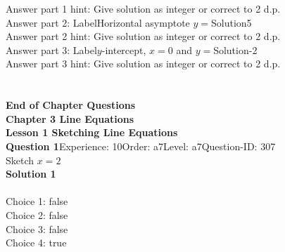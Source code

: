 \documentclass{article}
\begin{document}
Answer part 1 hint: \hspace{15pt}Give solution as integer or correct to 2 d.p.\\
Answer part 2: \hspace{10pt}Label\hspace{10pt}Horizontal asymptote $y =$\hspace{10pt}Solution\hspace{10pt}5\\
Answer part 2 hint: \hspace{15pt}Give solution as integer or correct to 2 d.p.\\
Answer part 3: \hspace{10pt}Label\hspace{10pt}$y$-intercept, $x=0$ and $y=$\hspace{10pt}Solution\hspace{10pt}-2\\
Answer part 3 hint: \hspace{15pt}Give solution as integer or correct to 2 d.p.\\
\\[4pt]
\\[2pt]
\noindent\large{\textbf{End of Chapter Questions}}\\[15pt]
\noindent\huge{\textbf{Chapter 3 Line Equations}}\\[15pt]
\noindent\huge{\textbf{Lesson 1 Sketching Line Equations}}\\[12pt]
\noindent\textbf{Question 1}\hspace{20pt}Experience: 10\hspace{20pt}Order: a7\hspace{20pt}Level: a7\hspace{20pt}Question-ID: 307\\[2pt]
Sketch $x=2$\\[4pt]
\noindent\textbf{Solution 1}\\[2pt]
\\[4pt]
Choice 1: \hspace{20pt} \hspace{20pt}false\\
Choice 2: \hspace{20pt} \hspace{20pt}false\\
Choice 3: \hspace{20pt} \hspace{20pt}false\\
Choice 4: \hspace{20pt} \hspace{20pt}true\\
\end{document}

